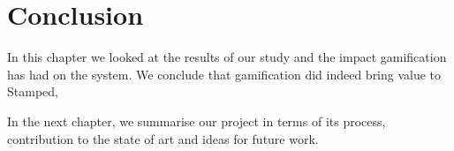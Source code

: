 \section{Conclusion}
In this chapter we looked at the results of our study and the impact gamification has had on the system. We conclude that gamification did indeed bring value to Stamped, 

In the next chapter, we summarise our project in terms of its process, contribution to the state of art and ideas for future work. 